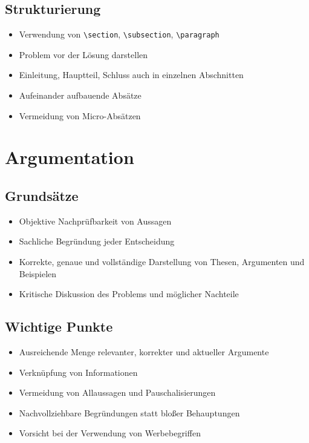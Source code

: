 \documentclass[12pt,a4paper,oneside]{article}
\begin{document}
\subsection{Strukturierung}
\begin{itemize}
    \item Verwendung von \verb|\section|, \verb|\subsection|, \verb|\paragraph|
    \item Problem vor der Lösung darstellen
    \item Einleitung, Hauptteil, Schluss auch in einzelnen Abschnitten
    \item Aufeinander aufbauende Absätze
    \item Vermeidung von \glqq Micro-Absätzen\grqq{}
\end{itemize}

\section{Argumentation}

\subsection{Grundsätze}
\begin{itemize}
    \item Objektive Nachprüfbarkeit von Aussagen
    \item Sachliche Begründung jeder Entscheidung
    \item Korrekte, genaue und vollständige Darstellung von Thesen, Argumenten und Beispielen
    \item Kritische Diskussion des Problems und möglicher Nachteile
\end{itemize}

\subsection{Wichtige Punkte}
\begin{itemize}
    \item Ausreichende Menge relevanter, korrekter und aktueller Argumente
    \item Verknüpfung von Informationen
    \item Vermeidung von Allaussagen und Pauschalisierungen
    \item Nachvollziehbare Begründungen statt bloßer Behauptungen
    \item Vorsicht bei der Verwendung von Werbebegriffen
\end{itemize}
\end{document}
